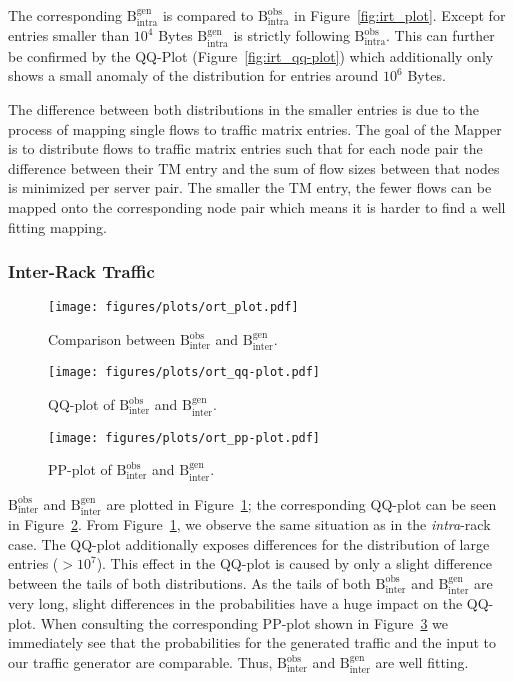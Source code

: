 \documentclass[journal,10pt]{IEEEtran}
\newcommand{\bytes}[2]{\ensuremath{\mathrm{B}^{\mathrm{#1}}_{\mathrm{#2}}}}
\begin{document}
		The corresponding \bytes{gen}{intra}
		is compared to \bytes{obs}{intra} in Figure~\ref{fig:irt_plot}.
		Except for entries smaller than $10^4$ Bytes \bytes{gen}{intra} is strictly following \bytes{obs}{intra}.
		This can further be confirmed by the QQ-Plot (Figure~\ref{fig:irt_qq-plot}) which additionally only shows a small anomaly of the distribution
		for entries around $10^6$ Bytes.
		
		The difference between both distributions in the smaller entries is due to the process of mapping single flows to traffic matrix entries.
		The goal of the Mapper is to distribute flows to traffic matrix entries such that for each node pair the difference between 
		their TM entry and the sum of flow sizes between that nodes is minimized per server pair.
		The smaller the TM entry, the fewer flows can be mapped onto the corresponding node pair which means it is harder to find a well fitting mapping.
		
		
		
		
		
		
		\subsubsection{Inter-Rack Traffic}
		\begin{figure}
			\centering
				\texttt{[image: figures/plots/ort\_plot.pdf]}
				\caption{Comparison between \bytes{obs}{inter} and \bytes{gen}{inter}.}
				\label{fig:ort_plot}
\end{figure}
		
		\begin{figure}
			\centering
				\texttt{[image: figures/plots/ort\_qq-plot.pdf]}
				
				\caption{QQ-plot of \bytes{obs}{inter} and \bytes{gen}{inter}.}
				\label{fig:ort_qq-plot}
\end{figure}
		
		\begin{figure}
			\centering
				\texttt{[image: figures/plots/ort\_pp-plot.pdf]}
				\caption{PP-plot of \bytes{obs}{inter} and \bytes{gen}{inter}.}
				\label{fig:ort_pp-plot}
\end{figure}
		
		\bytes{obs}{inter} and \bytes{gen}{inter} are plotted in Figure~\ref{fig:ort_plot};
		the corresponding QQ-plot can be seen
		in Figure~\ref{fig:ort_qq-plot}.
		From Figure~\ref{fig:ort_plot}, we observe the same situation as in the
		\emph{intra}-rack case. The QQ-plot additionally exposes differences for the distribution of large entries ($>10^7$).
		This effect in the QQ-plot is caused by only a slight difference between the tails of both distributions. As the tails of both
		\bytes{obs}{inter} and \bytes{gen}{inter} are very long, slight differences in the probabilities have a huge impact on the QQ-plot.
		When consulting the corresponding PP-plot shown in Figure~\ref{fig:ort_pp-plot} we immediately see that 
		the probabilities for the generated traffic and the input to our traffic generator are comparable.
		Thus, \bytes{obs}{inter} and \bytes{gen}{inter} are well fitting.
		
\end{document}
